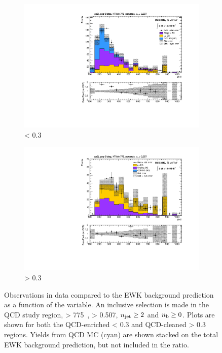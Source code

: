 \begin{figure}[t]
  \centering
  \begin{subfigure}[b]{0.46\textwidth}
    \includegraphics[width=\textwidth]
    {Figs/datapred/qcd_study_region/ge2j_ge0b_775_upwards/Prediction_MHT_all_775_upwards_QCD.pdf}
    \caption{\mindphistar < 0.3}
    \label{fig:datapred_mht_lt0p3}
  \end{subfigure}
  \begin{subfigure}[b]{0.46\textwidth}
    \includegraphics[width=\textwidth]
    {Figs/datapred/qcd_study_region/ge2j_ge0b_775_upwards/gt0p3/Prediction_MHT_all_775_upwards_QCD.pdf}
    \caption{\mindphistar > 0.3}
    \label{fig:datapred_mht_gt0p3}
  \end{subfigure}
  \caption{Observations in data compared to the EWK background prediction
  as a function of the \mht variable.
  An inclusive selection is made in the QCD study region, \HT > 775~\gev,
  \alphat > 0.507, $n_{\text{jet}} \geq 2$ and $n_{\text{b}} \geq 0$. Plots are shown for
  both the
  QCD-enriched \mindphistar < 0.3 and QCD-cleaned \mindphistar > 0.3 regions.
  Yields from QCD MC (cyan) are shown stacked on the total EWK background
  prediction, but not included in the ratio.}
  \label{fig:datapred_mht_before_after_dphi}
\end{figure}

